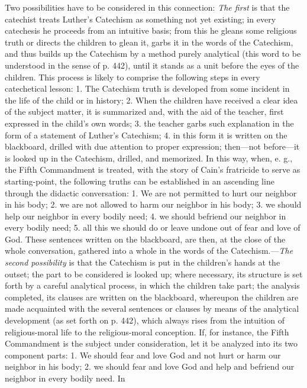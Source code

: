 Two possibilities have to be considered in this connection: \emph{The first} is that the catechist treats Luther’s Catechism as something not yet existing; in every catechesis he proceeds from an intuitive basis; from this he gleans some religious truth or directs the children to glean it, garbs it in the words of the Catechism, and thus builds up the Catechism by a method purely analytical (this word to be understood in the sense of p. 442), until it stands as a unit before the eyes of the children. This process is likely to comprise the following steps in every catechetical lesson: 1. The
Catechism truth is developed from some incident in the life of the child or in history; 2. When the children have received a clear idea of the subject matter, it is summarized and, with the aid of the teacher, first expressed in the child’s own words; 3. the teacher garbs such explanation in the form of a statement of Luther’s Catechism; 4. in this form it is written on the blackboard, drilled with due attention to proper expression; then—not before—it is looked up in the Catechism, drilled, and memorized. In this way, when, e. g., the Fifth Commandment is treated, with the story of Cain’s fratricide to serve as starting-point, the following truths can be established in an ascending line through the didactic conversation: 1. We are not permitted to hurt our neighbor in his body; 2. we are not allowed to harm our neighbor in his body; 3. we should help our neighbor in every bodily need; 4. we should befriend our neighbor in every bodily need; 5. all this we should do or leave undone out of fear and love of God. These sentences written on the blackboard, are then, at the close of the whole conversation, gathered into a whole in the words of the Catechism.—\emph{The second possibility} is that the Catechism is put in the children’s hands at the outset; the part to be considered is looked up; where necessary, its structure is set forth by a careful analytical process, in which the children take part; the analysis completed, its clauses are written on the blackboard, whereupon the children are made acquainted with the several sentences or clauses by means of the analytical development (as set forth on p. 442), which always rises from the intuition of religious-moral life to the religious-moral conception. If, for instance, the Fifth Commandment is the subject under consideration, let it be analyzed into its two component parts: 1. We should fear and love God and not hurt or harm our neighbor in his body; 2. we should fear and love God and help and befriend our neighbor in every bodily need. In
